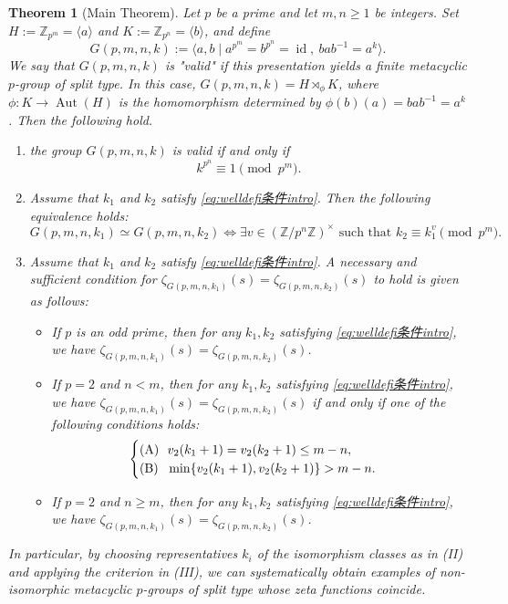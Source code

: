 \documentclass[onecolumn]{article}
\numberwithin{equation}{section}
\theoremstyle{mytheoremstyle}
\newtheorem{thm}{Theorem}[section]
\DeclareMathOperator{\Aut}{\mathrm{Aut}}
\DeclareMathOperator{\id}{\mathrm{id}}
\begin{document}
\begin{thm}[Main Theorem]\label{thm:metamaintheorem}
Let $p$ be a prime and let $m,n\ge1$ be integers.
Set $H:=\mathbb{Z}_{p^{m}}=\langle a\rangle$ and
$K:=\mathbb{Z}_{p^{n}}=\langle b\rangle$, and define
\begin{equation}\label{eq:Gpmnk}
G(p,m,n,k)
  :=\langle a,b \mid a^{p^{m}}=b^{p^{n}}=\id,\ bab^{-1}=a^{k}\rangle.
\end{equation}
We say that $G(p,m,n,k)$ is "\emph{valid}" if this presentation yields a finite
metacyclic $p$-group of split type.
In this case, $G(p,m,n,k)=H\rtimes_{\phi}K$, where $\phi\colon K\to \Aut(H)$ is the homomorphism determined by
$\phi(b)(a)=bab^{-1}=a^{k}$.
Then the following hold.
\begin{enumerate}
 \item[(I)] the group $G(p,m,n,k)$ is valid if and only if
 \begin{equation}\label{eq:welldefi条件intro}
  k^{p^{n}}\equiv 1 \pmod{p^{m}}.
\end{equation}

 \item[(II)] Assume that $k_1$ and $k_2$ satisfy \eqref{eq:welldefi条件intro}. Then the following equivalence holds:
\[
   G(p,m,n,k_{1})\simeq G(p,m,n,k_{2})
  \iff
  \exists v\in (\mathbb{Z}/p^{n}\mathbb{Z})^{\times}
  \text{ such that } k_{2}\equiv k_{1}^{v} \pmod{p^{m}}.
\]

 \item[(III)] Assume that $k_1$ and $k_2$ satisfy \eqref{eq:welldefi条件intro}. A necessary and sufficient condition for
 $\zeta_{G(p,m,n,k_{1})}(s)=\zeta_{G(p,m,n,k_{2})}(s)$ to hold
 is given as follows:
 \begin{itemize}
 \item[(1)] If $p$ is an odd prime, then for any $k_1,k_2$
 satisfying \eqref{eq:welldefi条件intro}, we have
 $\zeta_{G(p,m,n,k_{1})}(s)=\zeta_{G(p,m,n,k_{2})}(s)$.

 \item[(2)] If $p=2$ and $n<m$, then for any $k_1,k_2$
 satisfying \eqref{eq:welldefi条件intro}, we have
 $\zeta_{G(p,m,n,k_{1})}(s)=\zeta_{G(p,m,n,k_{2})}(s)$
 if and only if one of the following conditions holds:
 \[
 \begin{cases}
 \text{\textup{(A)}}\ \ v_2(k_1+1)=v_2(k_2+1)\le m-n,\\
 \text{\textup{(B)}}\ \ \min\{v_2(k_1+1), v_2(k_2+1)\}> m-n.
 \end{cases}
 \]

 \item[(3)] If $p=2$ and $n\ge m$, then for any $k_1,k_2$
 satisfying \eqref{eq:welldefi条件intro}, we have
 $\zeta_{G(p,m,n,k_{1})}(s)=\zeta_{G(p,m,n,k_{2})}(s)$.
 \end{itemize}
\end{enumerate}
In particular, by choosing representatives $k_{i}$ of the isomorphism classes
as in {\rm(II)} and applying the criterion in {\rm(III)}, we can systematically
obtain examples of non-isomorphic metacyclic $p$-groups of split type whose zeta
functions coincide.
\end{thm}
\end{document}
